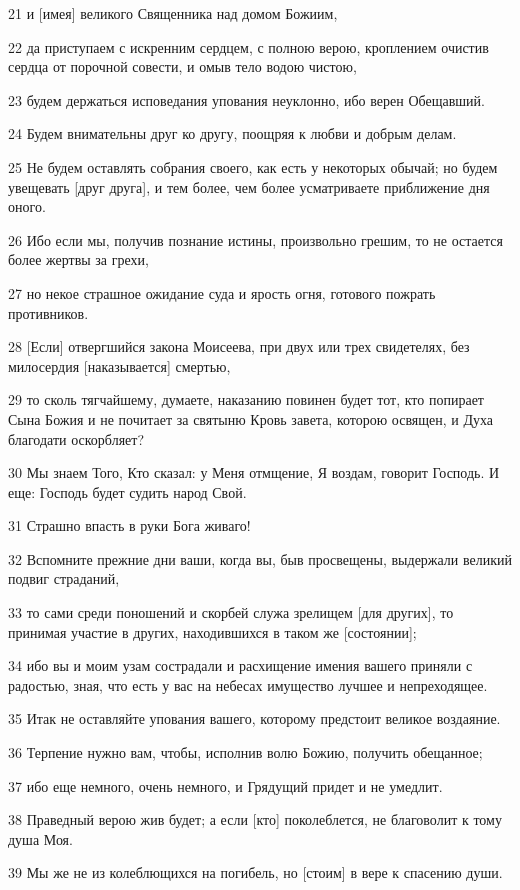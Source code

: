 \par 21 и [имея] великого Священника над домом Божиим,
\par 22 да приступаем с искренним сердцем, с полною верою, кроплением очистив сердца от порочной совести, и омыв тело водою чистою,
\par 23 будем держаться исповедания упования неуклонно, ибо верен Обещавший.
\par 24 Будем внимательны друг ко другу, поощряя к любви и добрым делам.
\par 25 Не будем оставлять собрания своего, как есть у некоторых обычай; но будем увещевать [друг друга], и тем более, чем более усматриваете приближение дня оного.
\par 26 Ибо если мы, получив познание истины, произвольно грешим, то не остается более жертвы за грехи,
\par 27 но некое страшное ожидание суда и ярость огня, готового пожрать противников.
\par 28 [Если] отвергшийся закона Моисеева, при двух или трех свидетелях, без милосердия [наказывается] смертью,
\par 29 то сколь тягчайшему, думаете, наказанию повинен будет тот, кто попирает Сына Божия и не почитает за святыню Кровь завета, которою освящен, и Духа благодати оскорбляет?
\par 30 Мы знаем Того, Кто сказал: у Меня отмщение, Я воздам, говорит Господь. И еще: Господь будет судить народ Свой.
\par 31 Страшно впасть в руки Бога живаго!
\par 32 Вспомните прежние дни ваши, когда вы, быв просвещены, выдержали великий подвиг страданий,
\par 33 то сами среди поношений и скорбей служа зрелищем [для других], то принимая участие в других, находившихся в таком же [состоянии];
\par 34 ибо вы и моим узам сострадали и расхищение имения вашего приняли с радостью, зная, что есть у вас на небесах имущество лучшее и непреходящее.
\par 35 Итак не оставляйте упования вашего, которому предстоит великое воздаяние.
\par 36 Терпение нужно вам, чтобы, исполнив волю Божию, получить обещанное;
\par 37 ибо еще немного, очень немного, и Грядущий придет и не умедлит.
\par 38 Праведный верою жив будет; а если [кто] поколеблется, не благоволит к тому душа Моя.
\par 39 Мы же не из колеблющихся на погибель, но [стоим] в вере к спасению души.


